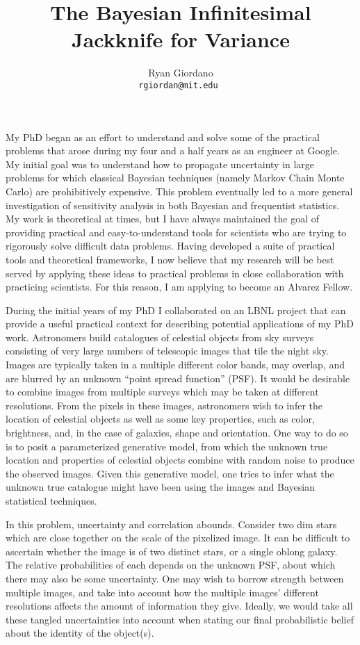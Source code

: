 

\title{The Bayesian Infinitesimal Jackknife for Variance}

\author{
  Ryan Giordano \\ \texttt{rgiordan@mit.edu }
}



My PhD began as an effort to understand and solve some of the practical problems
that arose during my four and a half years as an engineer at Google.  My initial
goal was to understand how to propagate uncertainty in large problems for which
classical Bayesian techniques (namely Markov Chain Monte Carlo) are
prohibitively expensive.  This problem eventually led to a more general
investigation of sensitivity analysis in both Bayesian and frequentist
statistics.  My work is theoretical at times, but I have always maintained the
goal of providing practical and easy-to-understand tools for scientists who are
trying to rigorously solve difficult data problems.  Having developed a suite of
practical tools and theoretical frameworks, I now believe that my research will
be best served by applying these ideas to practical problems in close
collaboration with practicing scientists.  For this reason, I am applying to
become an Alvarez Fellow.

During the initial years of my PhD I collaborated on an LBNL project that can
provide a useful practical context for describing potential applications of my
PhD work.  Astronomers build catalogues of celestial objects from sky surveys
consisting of very large numbers of telescopic images that tile the night sky.
Images are typically taken in a multiple different color bands, may overlap, and
are blurred by an unknown ``point spread function'' (PSF). It would be desirable
to combine images from multiple surveys which may be taken at different
resolutions.  From the pixels in these images, astronomers wish to infer the
location of celestial objects as well as some key properties, such as color,
brightness, and, in the case of galaxies, shape and orientation.  One way to do
so is to posit a parameterized generative model, from which the unknown true
location and properties of celestial objects combine with random noise to
produce the observed images.  Given this generative model, one tries to infer
what the unknown true catalogue might have been using the images and Bayesian
statistical techniques.

In this problem, uncertainty and correlation abounds.  Consider two dim stars
which are close together on the scale of the pixelized image.  It can be
difficult to ascertain whether the image is of two distinct stars, or a single
oblong galaxy.  The relative probabilities of each depends on the unknown PSF,
about which there may also be some uncertainty.  One may wish to borrow
strength between multiple images, and take into account how the multiple
images' different resolutions affects the amount of information they give.
Ideally, we would take all these tangled uncertainties into account when stating
our final probabilistic belief about the identity of the object(s).

